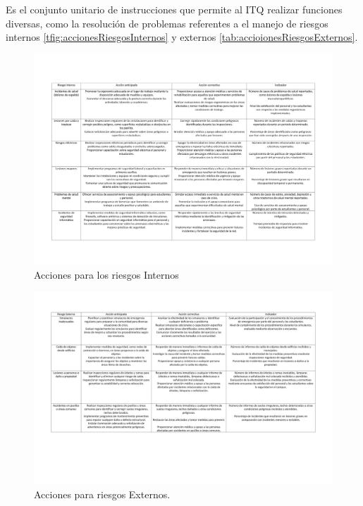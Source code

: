     
    Es el conjunto unitario de instrucciones que permite al ITQ realizar funciones diversas, como la resolución de problemas referentes a el manejo de riesgos internos \ref{tfig:accionesRiesgosInternos} y externos \ref{tab:accioionesRiesgosExternos}.
    
    \begin{figure}[H]
        \centering
        \includegraphics[scale=0.150]{21/img/accionesRiesgosInternos.pdf}
        \caption{Acciones para los riesgos Internos}
        \label{fig:accionesRiesgosInternos}
    \end{figure}
    
     
    \begin{figure}[H]
        \centering
        \includegraphics[scale=0.150]{21/img/accionesRiesgosExternos.pdf}
        \caption{Acciones para riesgos Externos.}
        \label{fig:accionesRiesgosExternos}
    \end{figure}
    
